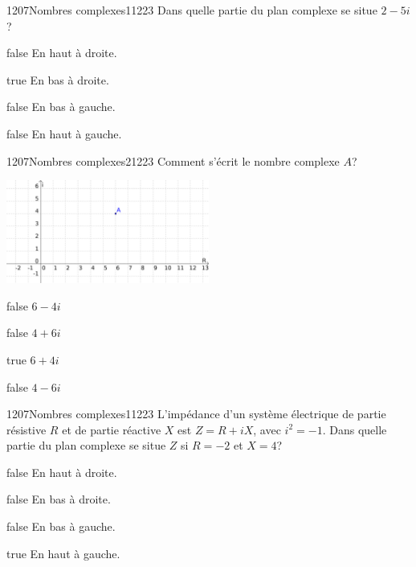             \begin{question}{1207}{Nombres complexes}{1}{1223}
                Dans quelle partie du plan complexe se situe $2-5i$?
            \end{question}
            \begin{reponses}
                \item[false] En haut à droite.
                \item[true] En bas à droite.
                \item[false] En bas à gauche.
                \item[false] En haut à gauche.
            \end{reponses}
            \begin{question}{1207}{Nombres complexes}{2}{1223}
                Comment s'écrit le nombre complexe $A$?\\
                \begin{center}
                	\includegraphics[width=0.5\textwidth]{Philippe/Figures_Philippe/complexes_5_1.png}
                \end{center}
            \end{question}
            \begin{reponses}
                \item[false] $6-4i$
                \item[false] $4+6i$
                \item[true] $6+4i$
                \item[false] $4-6i$
            \end{reponses}
            \begin{question}{1207}{Nombres complexes}{1}{1223}
                L'impédance d'un système électrique de partie résistive $R$ et de partie réactive $X$ est $Z = R + iX$, avec $i^2=-1$. Dans quelle partie du plan complexe se situe $Z$ si $R=-2$ et $X=4$?
            \end{question}
            \begin{reponses}
                \item[false] En haut à droite.
                \item[false] En bas à droite.
                \item[false] En bas à gauche.
                \item[true] En haut à gauche.
            \end{reponses}
